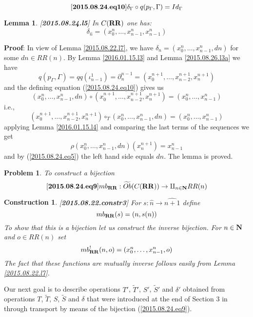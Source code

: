 \documentclass[11pt]{article}
\newenvironment{eq}{\begin{equation}}{\end{equation}}
\newenvironment{proof}{{\bf Proof}:}{\vskip 5mm }
\newtheorem{lemma}[proposition]{Lemma}
\newtheorem{problem}[proposition]{Problem}
\newtheorem{construction}[proposition]{Construction}
\newcommand{\llabel}[1]{\label{#1}[{\bf #1}]}
\newcommand{\sr}{\rightarrow}
\newcommand{\nn}{{\bf N\rm}}
\newcommand{\nat}{\nn}
\newcommand{\wt}{\widetilde}
\newcommand{\wh}{\widehat}
\newcommand{\mbind}{\rho}
\newcommand{\hc}{\circ_{T}}
\newcommand{\RR}{{\bf RR}}
\begin{document}
%
\begin{eq}\llabel{2015.08.24.eq10}
\delta_{\Gamma}\circ q(p_{\Gamma},\Gamma)=Id_{\Gamma}
\end{eq}
%
\begin{lemma}\llabel{2015.08.24.l5}
In $C(\RR)$ one has: 
%
$$\delta_{\wh{n}}=(x_0^{n},\dots,x_{n-1}^{n},x_{n-1}^n)$$
%
\end{lemma}
%
\begin{proof}
In view of Lemma \ref{2015.08.22.l7}, we have $\delta_n=(x_0^{n},\dots,x_{n-1}^{n},dn)$ for some $dn\in RR(n)$. By Lemma \ref{2016.01.15.l3} and Lemma \ref{2015.08.26.l3a} we have
%
$$q(p_{\Gamma},\Gamma)=qq(\iota_{n-1}^1)=\partial^{n-1}_{n}=(x_0^{n+1},\dots,x_{n-2}^{n+1},x_n^{n+1})$$
%
and the defining equation (\ref{2015.08.24.eq10}) gives us
%
$$(x_0^{n},\dots,x_{n-1}^{n},dn)\circ (x_0^{n+1},\dots,x_{n-2}^{n+1},x_n^{n+1})=(x_0^n,\dots,x_{n-1}^n)$$
%
i.e.,
%
$$(x_0^{n+1},\dots,x_{n-2}^{n+1},x_n^{n+1})\hc (x_0^{n},\dots,x_{n-1}^{n},dn) =(x_0^n,\dots,x_{n-1}^n)$$
%
applying Lemma \ref{2016.01.15.l4} and comparing the last terms of the sequences we get
%
$$\mbind(x_0^{n},\dots,x_{n-1}^{n},dn)(x_n^{n+1})=x_{n-1}^n$$
%
and by (\ref{2015.08.24.eq5}) the left hand side equals $dn$. The lemma is proved. 
\end{proof}
%












%
\begin{problem}
To construct a bijection
%
\begin{eq}\llabel{2015.08.24.eq9}
mb_{\RR}:\wt{Ob}(C(\RR))\sr \amalg_{n\in\nat} RR(n)
\end{eq}
%
\end{problem}
%
\begin{construction}\rm
\llabel{2015.08.22.constr3}
For $s:\wh{n}\sr \wh{n+1}$ define
%
$$mb_{\RR}(s)=(n,s(n))$$
%
To show that this is a bijection let us construct the inverse bijection. For $n\in\nn$ and $o\in RR(n)$ set
%
$$mb_{\RR}^!(n,o)=(x_0^n,\dots,x_{n-1}^n,o)$$
%
The fact that these functions are mutually inverse follows easily from Lemma \ref{2015.08.22.l7}.
\end{construction}
%

Our next goal is to describe operations $T'$, $\wt{T}'$, $S'$, $\wt{S}'$ and $\delta'$ obtained from operations $T$, $\wt{T}$, $S$, $\wt{S}$ and $\delta$ that were introduced at the end of Section 3 in \cite{Csubsystems} through transport by means of the bijection (\ref{2015.08.24.eq9}).
\end{document}
